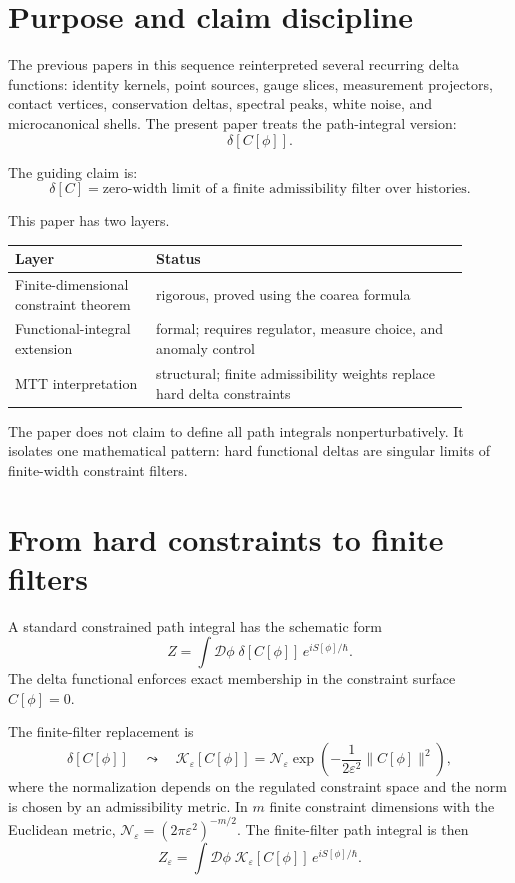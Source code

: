 \documentclass[11pt]{article}
\begin{document}
\tableofcontents

\section{Purpose and claim discipline}

The previous papers in this sequence reinterpreted several recurring delta functions:
identity kernels, point sources, gauge slices, measurement projectors, contact vertices,
conservation deltas, spectral peaks, white noise, and microcanonical shells.
The present paper treats the path-integral version:
\[
\delta[C[\phi]] .
\]

The guiding claim is:
\[
\boxed{\delta[C]=\text{zero-width limit of a finite admissibility filter over histories}.}
\]

This paper has two layers.

\begin{center}
\begin{tabular}{>{\raggedright\arraybackslash}p{0.28\linewidth}>{\raggedright\arraybackslash}p{0.62\linewidth}}
\toprule
Layer & Status \\
\midrule
Finite-dimensional constraint theorem & rigorous, proved using the coarea formula \\
Functional-integral extension & formal; requires regulator, measure choice, and anomaly control \\
MTT interpretation & structural; finite admissibility weights replace hard delta constraints \\
\bottomrule
\end{tabular}
\end{center}

The paper does not claim to define all path integrals nonperturbatively.  It isolates one
mathematical pattern: hard functional deltas are singular limits of finite-width constraint
filters.

\section{From hard constraints to finite filters}

A standard constrained path integral has the schematic form
\[
Z=\int \mathcal D\phi\; \delta[C[\phi]]\,e^{iS[\phi]/\hbar}.
\]
The delta functional enforces exact membership in the constraint surface \(C[\phi]=0\).

The finite-filter replacement is
\[
\delta[C[\phi]]
\quad\leadsto\quad
\mathcal K_\varepsilon[C[\phi]]
=
\mathcal N_\varepsilon
\exp\!\left(-\frac{1}{2\varepsilon^2}\|C[\phi]\|^2\right),
\]
where the normalization depends on the regulated constraint space and the norm is chosen by
an admissibility metric. In \(m\) finite constraint dimensions with the Euclidean metric,
\(\mathcal N_\varepsilon=(2\pi\varepsilon^2)^{-m/2}\).
The finite-filter path integral is then
\[
Z_\varepsilon
=
\int \mathcal D\phi\;
\mathcal K_\varepsilon[C[\phi]]\,
e^{iS[\phi]/\hbar}.
\]
\end{document}
